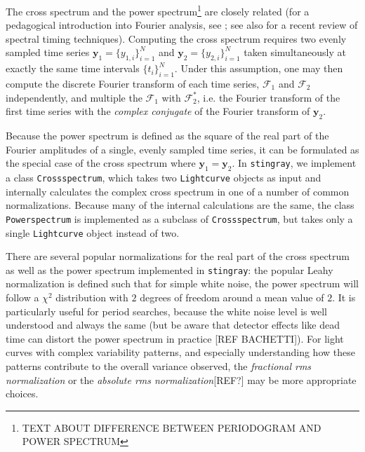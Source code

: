 \documentclass[12pt]{emulateapj}
\newcommand{\stingray}{\texttt{stingray}\xspace}
\newcommand{\lightcurve}{\texttt{Lightcurve}\xspace}
\newcommand{\crossspectrum}{\texttt{Crossspectrum}\xspace}
\newcommand{\powerspectrum}{\texttt{Powerspectrum}\xspace}
\begin{document}
The cross spectrum and the power spectrum\footnote{TEXT ABOUT DIFFERENCE BETWEEN PERIODOGRAM AND POWER SPECTRUM} are closely related (for a pedagogical introduction into Fourier analysis, see \citealt{vanderklis1989}; see also \citealt{uttley2014} for a recent review of spectral timing techniques). Computing the cross spectrum requires two evenly sampled time series $\mathbf{y}_1 = \{y_{1,i}\}_{i=1}^{N} $ and $\mathbf{y}_2 =  \{y_{2,i}\}_{i=1}^{N}$ taken simultaneously at exactly the same time intervals $\{t_i \}_{i=1}^N$. Under this assumption, one may then compute the discrete Fourier transform of each time series, $\mathcal{F}_1$ and $\mathcal{F}_2$ independently, and multiple the $\mathcal{F}_1$ with $\mathcal{F}^{*}_2$, i.e. the Fourier transform of the first time series with the \textit{complex conjugate} of the Fourier transform of $\mathbf{y}_2$. 

Because the power spectrum is defined as the square of the real part of the Fourier amplitudes of a single, evenly sampled time series, it can be formulated as the special case of the cross spectrum where $\mathbf{y}_1 = \mathbf{y}_2$. In \stingray, we implement a class \crossspectrum, which takes two \lightcurve objects as input and internally calculates the complex cross spectrum in one of a number of common normalizations.  Because many of the internal calculations are the same, the class \powerspectrum is implemented as a subclass of \crossspectrum, but takes only a single \lightcurve object instead of two. 

There are several popular normalizations for the real part of the cross spectrum as well as the power spectrum implemented in \stingray: the popular Leahy normalization \citep{leahy1983} is defined such that for simple white noise, the power spectrum will follow a $\chi^2$ distribution with $2$ degrees of freedom around a mean value of $2$. It is particularly useful for period searches, because the white noise level is well understood and always the same (but be aware that detector effects like dead time can distort the power spectrum in practice [REF BACHETTI]).
For light curves with complex variability patterns, and especially understanding how these patterns contribute to the overall variance observed, the \textit{fractional rms normalization}\citep{belloni1990,miyamoto1992}  or the \textit{absolute rms normalization}[REF?] may be more appropriate choices. 
\end{document}
